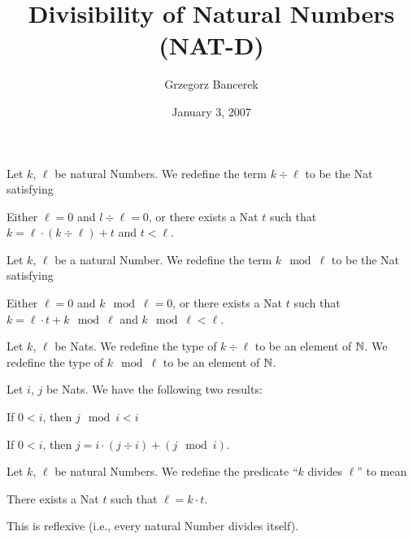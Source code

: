 \documentclass{article}
\title{Divisibility of Natural Numbers (NAT-D)}
\author{Grzegorz Bancerek}
\date{January 3, 2007}
\begin{document}
\maketitle

\begin{definition}
Let $k$, $\ell$ be natural Numbers.
We redefine the term $k\div\ell$ to be the Nat satisfying
\begin{defn}
\item Either $\ell=0$ and $l\div\ell=0$, or
  there exists a Nat $t$ such that $k=\ell\cdot(k\div\ell) + t$ and $t<\ell$. 
\end{defn}
\end{definition}

\begin{definition}
Let $k$, $\ell$ be a natural Number.
We redefine the term $k\mod{\ell}$ to be the Nat satisfying
\begin{defn}
\item Either $\ell=0$ and $k\mod{\ell}=0$,
  or there exists a Nat $t$ such that $k=\ell\cdot t+k\mod{\ell}$ and $k\mod{\ell}<\ell$.
\end{defn}
\end{definition}

\begin{definition}
Let $k$, $\ell$ be Nats.
We redefine the type of $k\div\ell$ to be an element of $\mathbb{N}$.
We redefine the type of $k\mod{\ell}$ to be an element of $\mathbb{N}$.
\end{definition}

Let $i$, $j$ be Nats. We have the following two results:
\begin{thm}
\item\label{natd:1} If $0<i$, then $j\mod{i}<i$
\item\label{natd:2} If $0<i$, then $j=i\cdot(j\div i)+(j\mod{i})$.
\end{thm}

\begin{definition}
Let $k$, $\ell$ be natural Numbers.
We redefine the predicate ``$k$ divides $\ell$'' to mean
\begin{defn}
\item There exists a Nat $t$ such that $\ell=k\cdot t$.
\end{defn}
This is reflexive (i.e., every natural Number divides itself).
\end{definition}
\end{document}
